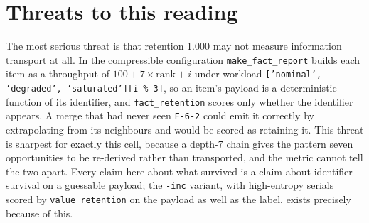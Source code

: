 \documentclass[11pt]{article}
\begin{document}
\section{Threats to this reading}

The most serious threat is that retention 1.000 may not measure information transport at
all. In the compressible configuration \texttt{make\_fact\_report} builds each item as a
throughput of $100 + 7 \times \text{rank} + i$ under workload
\texttt{['nominal', 'degraded', 'saturated'][i \% 3]}, so an item's payload is a
deterministic function of its identifier, and \texttt{fact\_retention} scores only
whether the identifier appears. A merge that had never seen \texttt{F-6-2} could emit it
correctly by extrapolating from its neighbours and would be scored as retaining it. This
threat is sharpest for exactly this cell, because a depth-7 chain gives the pattern
seven opportunities to be re-derived rather than transported, and the metric cannot tell
the two apart. Every claim here about what survived is a claim about identifier survival
on a guessable payload; the \texttt{-inc} variant, with high-entropy serials scored by
\texttt{value\_retention} on the payload as well as the label, exists precisely because
of this.
\end{document}
